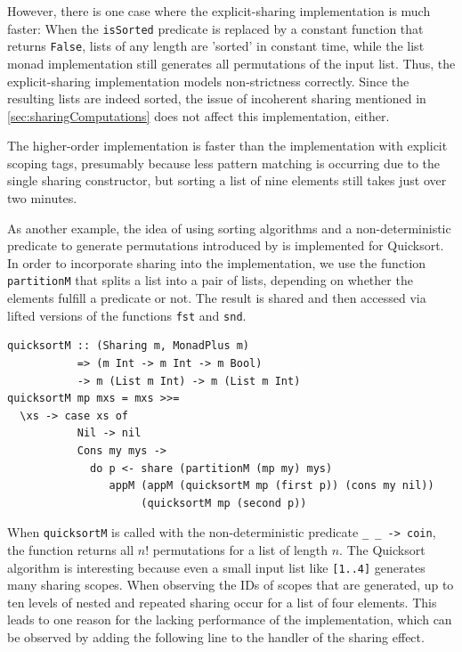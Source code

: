 \documentclass[a4paper, 11pt, fleqn, twoside, abstract=on]{scrreprt}
\newcommand{\hinl}[1]{\texttt{#1}}
\begin{document}
However, there is one case where the explicit-sharing implementation is much faster:
When the \hinl{isSorted} predicate is replaced by a constant function that returns \hinl{False}, lists of any length are 'sorted' in constant time, while the list monad implementation still generates all permutations of the input list.
Thus, the explicit-sharing implementation models non-strictness correctly.
Since the resulting lists are indeed sorted, the issue of incoherent sharing mentioned in \autoref{sec:sharingComputations} does not affect this implementation, either.

The higher-order implementation is faster than the implementation with explicit scoping tags, presumably because less pattern matching is occurring due to the single sharing constructor, but sorting a list of nine elements still takes just over two minutes.

As another example, the idea of using sorting algorithms and a non-deterministic predicate to generate permutations introduced by \citet{Christiansen2016allsorts} is implemented for Quicksort.
In order to incorporate sharing into the implementation, we use the function \hinl{partitionM} that splits a list into a pair of lists, depending on whether the elements fulfill a predicate or not.
The result is shared and then accessed via lifted versions of the functions \hinl{fst} and \hinl{snd}.

\begin{verbatim}
quicksortM :: (Sharing m, MonadPlus m) 
           => (m Int -> m Int -> m Bool) 
           -> m (List m Int) -> m (List m Int)
quicksortM mp mxs = mxs >>=
  \xs -> case xs of
           Nil -> nil
           Cons my mys ->
             do p <- share (partitionM (mp my) mys)
                appM (appM (quicksortM mp (first p)) (cons my nil)) 
                     (quicksortM mp (second p))
\end{verbatim}

When \hinl{quicksortM} is called with the non-deterministic predicate \hinl{\_ _ -> coin}, the function returns all $n!$ permutations for a list of length $n$.
The Quicksort algorithm is interesting because even a small input list like \hinl{[1..4]} generates many sharing scopes.
When observing the IDs of scopes that are generated, up to ten levels of nested and repeated sharing occur for a list of four elements.
This leads to one reason for the lacking performance of the implementation, which can be observed by adding the following line to the handler of the sharing effect.
\end{document}

